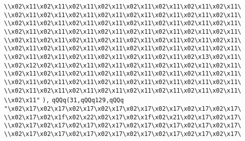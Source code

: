 \verb|\\x02\x11\x02\x11\x02\x11\x02\x11\x02\x11\x02\x11\x02\x11\x02\x11\|\newline
\verb|\\x02\x11\x02\x11\x02\x11\x02\x11\x02\x11\x02\x11\x02\x11\x02\x11\|\newline
\verb|\\x02\x11\x02\x11\x02\x11\x02\x11\x02\x11\x02\x11\x02\x11\x02\x11\|\newline
\verb|\\x02\x11\x02\x11\x02\x11\x02\x11\x02\x11\x02\x11\x02\x11\x02\x11\|\newline
\verb|\\x02\x11\x02\x11\x02\x11\x02\x11\x02\x11\x02\x11\x02\x11\x02\x11\|\newline
\verb|\\x02\x11\x02\x11\x02\x11\x02\x11\x02\x11\x02\x11\x02\x11\x02\x11\|\newline
\verb|\\x02\x11\x02\x11\x02\x11\x02\x11\x02\x11\x02\x11\x02\x13\x02\x11\|\newline
\verb|\\x02\x12\x02\x11\x02\x11\x02\x11\x02\x11\x02\x11\x02\x11\x02\x11\|\newline
\verb|\\x02\x11\x02\x11\x02\x11\x02\x11\x02\x11\x02\x11\x02\x11\x02\x11\|\newline
\verb|\\x02\x11\x02\x11\x02\x11\x02\x11\x02\x11\x02\x11\x02\x11\x02\x11\|\newline
\verb|\\x02\x11\x02\x11\x02\x11\x02\x11\x02\x11\x02\x11\x02\x11\x02\x11\|\newline
\verb|\\x02\x11"|\newline
\verb|),|\newline
\verb|qQQq(31,qQQq129,qQQq|\newline
\verb|"\x02\x17\x02\x17\x02\x17\x02\x17\x02\x17\x02\x17\x02\x17\x02\x17\|\newline
\verb|\\x02\x17\x02\x1f\x02\x22\x02\x17\x02\x1f\x02\x21\x02\x17\x02\x17\|\newline
\verb|\\x02\x17\x02\x17\x02\x17\x02\x17\x02\x17\x02\x17\x02\x17\x02\x17\|\newline
\verb|\\x02\x17\x02\x17\x02\x17\x02\x17\x02\x17\x02\x17\x02\x17\x02\x17\|\newline
